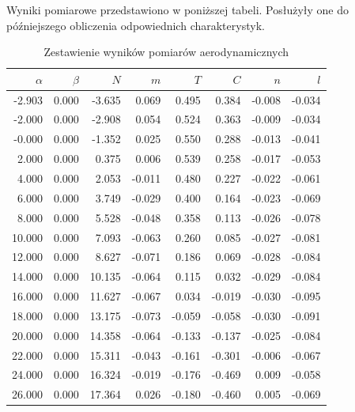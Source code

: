 \label{sec:Wyniki}

\akapit Wyniki pomiarowe przedstawiono w poniższej tabeli. Posłużyły one do późniejszego obliczenia odpowiednich charakterystyk.

\begin{table}[H]%
    \centering
    \caption{Zestawienie wyników pomiarów aerodynamicznych}
    \label{tab:pomiary}
    \vspace{0.6em}
    \small
    \setlength{\tabcolsep}{10pt}
    \renewcommand{\arraystretch}{1.12}
    \begin{tabular}{r r r r r r r r}
        \toprule
        $\alpha$ & $\beta$ & $N$ & $m$ & $T$ & $C$ & $n$ & $l$ \\
        \midrule
        -2.903 & 0.000 & -3.635 &  0.069 &  0.495 &  0.384 & -0.008 & -0.034 \\
        -2.000 & 0.000 & -2.908 &  0.054 &  0.524 &  0.363 & -0.009 & -0.034 \\
        -0.000 & 0.000 & -1.352 &  0.025 &  0.550 &  0.288 & -0.013 & -0.041 \\
         2.000 & 0.000 &  0.375 &  0.006 &  0.539 &  0.258 & -0.017 & -0.053 \\
         4.000 & 0.000 &  2.053 & -0.011 &  0.480 &  0.227 & -0.022 & -0.061 \\
         6.000 & 0.000 &  3.749 & -0.029 &  0.400 &  0.164 & -0.023 & -0.069 \\
         8.000 & 0.000 &  5.528 & -0.048 &  0.358 &  0.113 & -0.026 & -0.078 \\
        10.000 & 0.000 &  7.093 & -0.063 &  0.260 &  0.085 & -0.027 & -0.081 \\
        12.000 & 0.000 &  8.627 & -0.071 &  0.186 &  0.069 & -0.028 & -0.084 \\
        14.000 & 0.000 & 10.135 & -0.064 &  0.115 &  0.032 & -0.029 & -0.084 \\
        16.000 & 0.000 & 11.627 & -0.067 &  0.034 & -0.019 & -0.030 & -0.095 \\
        18.000 & 0.000 & 13.175 & -0.073 & -0.059 & -0.058 & -0.030 & -0.091 \\
        20.000 & 0.000 & 14.358 & -0.064 & -0.133 & -0.137 & -0.025 & -0.084 \\
        22.000 & 0.000 & 15.311 & -0.043 & -0.161 & -0.301 & -0.006 & -0.067 \\
        24.000 & 0.000 & 16.324 & -0.019 & -0.176 & -0.469 &  0.009 & -0.058 \\
        26.000 & 0.000 & 17.364 &  0.026 & -0.180 & -0.460 &  0.005 & -0.069 \\

\end{tabular}
\end{table}
